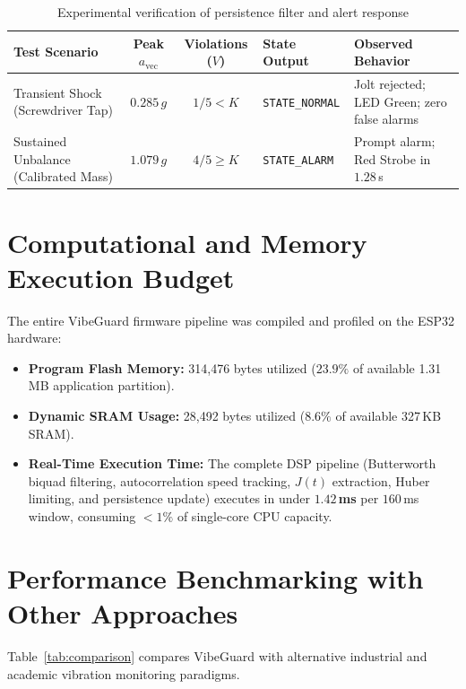 \begin{table}[H]
\centering
\caption{Experimental verification of persistence filter and alert response}
\label{tab:persistence_results}
\small
\begin{tabularx}{\textwidth}{l c c l X}
\toprule
\textbf{Test Scenario} & \textbf{Peak $a_{\mathrm{vec}}$} & \textbf{Violations ($V$)} & \textbf{State Output} & \textbf{Observed Behavior} \\
\midrule
Transient Shock (Screwdriver Tap) & $0.285\,g$ & $1 / 5 < K$ & \texttt{STATE\_NORMAL} & Jolt rejected; LED Green; zero false alarms \\
Sustained Unbalance (Calibrated Mass) & $1.079\,g$ & $4 / 5 \ge K$ & \texttt{STATE\_ALARM} & Prompt alarm; Red Strobe in $1.28$\,s \\
\bottomrule
\end{tabularx}
\end{table}

\section{Computational and Memory Execution Budget}
\hspace{2em}The entire VibeGuard firmware pipeline was compiled and profiled on the ESP32 hardware:
\begin{itemize}
    \item \textbf{Program Flash Memory:} 314,476 bytes utilized ($23.9\%$ of available 1.31\,MB application partition).
    \item \textbf{Dynamic SRAM Usage:} 28,492 bytes utilized ($8.6\%$ of available 327\,KB SRAM).
    \item \textbf{Real-Time Execution Time:} The complete DSP pipeline (Butterworth biquad filtering, autocorrelation speed tracking, $J(t)$ extraction, Huber limiting, and persistence update) executes in under \textbf{$1.42$\,ms} per $160$\,ms window, consuming \textbf{$<1\%$} of single-core CPU capacity.
\end{itemize}

\section{Performance Benchmarking with Other Approaches}
\hspace{2em}Table~\ref{tab:comparison} compares VibeGuard with alternative industrial and academic vibration monitoring paradigms.

